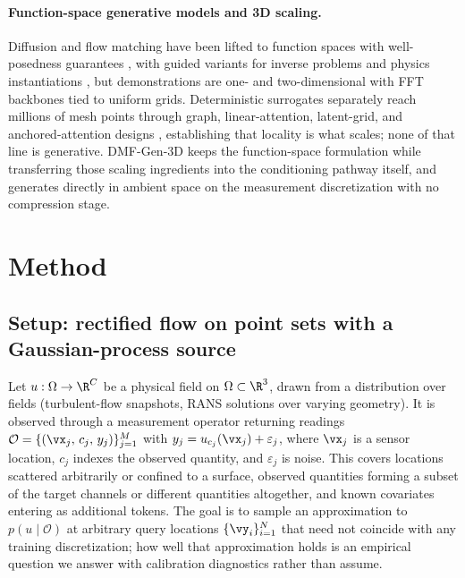 \documentclass{article} %
\newcommand{\model}{DMF-Gen-3D}
\begin{document}
\paragraph{Function-space generative models and 3D scaling.}
Diffusion and flow matching have been lifted to function spaces with well-posedness guarantees \citep{lim2025score,pidstrigach2024infinite,kerrigan2024functional,franzese2023continuous,shi2024universal,shi2025stochastic}, with guided variants for inverse problems \citep{yao2025fundps,baldassari2023conditional,kerrigan2024dynamic} and physics instantiations \citep{wang2026fundiff,bond2024infty}, but demonstrations are one- and two-dimensional with FFT backbones tied to uniform grids. Deterministic surrogates separately reach millions of mesh points through graph, linear-attention, latent-grid, and anchored-attention designs \citep{pfaff2021learning,hao2023gnot,wu2024transolver,li2023gino,luo2025transolver,alkin2024upt,alkin2025abupt}, establishing that locality is what scales; none of that line is generative. \model{} keeps the function-space formulation while transferring those scaling ingredients into the conditioning pathway itself, and generates directly in ambient space on the measurement discretization with no compression stage.

\section{Method}
\label{sec:method}

\subsection{Setup: rectified flow on point sets with a Gaussian-process source}
\label{sec:method-flow}

Let $u:\Omega\to\R^{C}$ be a physical field on $\Omega\subset\R^{3}$, drawn from a distribution over fields (turbulent-flow snapshots, RANS solutions over varying geometry). It is observed through a measurement operator returning readings $\mathcal{O}=\{(\vx_j,\,c_j,\,y_j)\}_{j=1}^{M}$ with $y_j = u_{c_j}(\vx_j)+\varepsilon_j$, where $\vx_j$ is a sensor location, $c_j$ indexes the observed quantity, and $\varepsilon_j$ is noise. This covers locations scattered arbitrarily or confined to a surface, observed quantities forming a subset of the target channels or different quantities altogether, and known covariates entering as additional tokens. The goal is to sample an approximation to $p(u\mid\mathcal{O})$ at arbitrary query locations $\{\vy_i\}_{i=1}^{N}$ that need not coincide with any training discretization; how well that approximation holds is an empirical question we answer with calibration diagnostics rather than assume.
\end{document}
